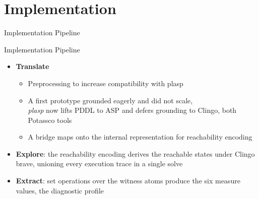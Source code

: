 \section{Implementation}

\begin{frame}{Implementation Pipeline}
    \begin{center}
    \end{center}

    \begin{block}{Implementation Pipeline}
        \begin{itemize}
            \item \textbf{Translate}
                  \begin{itemize}
                      \item Preprocessing to increase compatibility with plasp
                      \item A first prototype grounded eagerly and did not scale, \\\textit{plasp} now lifts PDDL to ASP and defers grounding to Clingo, both Potassco tools
                      \item A bridge maps onto the internal representation for reachability encoding
                  \end{itemize}
            \item \textbf{Explore}: the reachability encoding derives the reachable states under Clingo brave, unioning every execution trace in a single solve
            \item \textbf{Extract}: set operations over the witness atoms produce the six measure values, the diagnostic profile
        \end{itemize}
    \end{block}

\end{frame}

